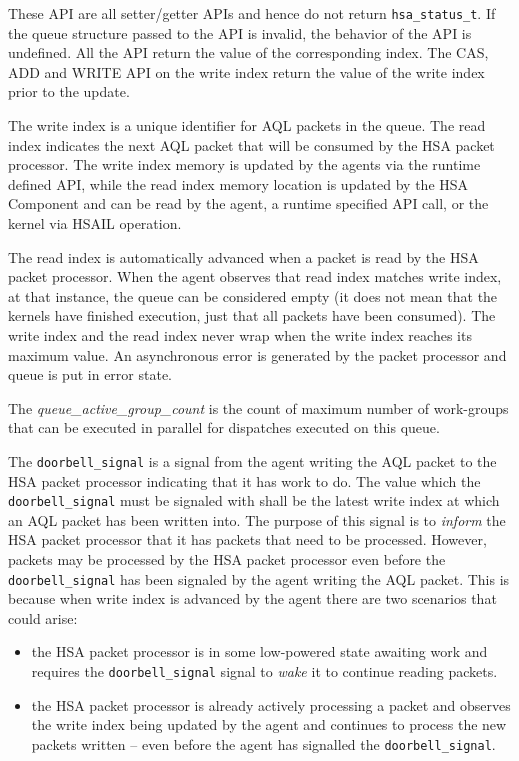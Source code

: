 

These API are all setter/getter APIs and hence do not return
\texttt{hsa\_status\_t}. If the queue structure passed to the API is
invalid, the behavior of the API is undefined. All the API return
the value of the corresponding index. The CAS, ADD and WRITE API on
the write index return the value of the write index prior to the
update.

The write index is a unique identifier for AQL packets in the
queue. The read index indicates the next AQL packet that will be
consumed by the HSA packet processor.  The write index 
memory is updated by the agents via the runtime defined 
API, while the read index memory location is updated by
the H\-S\-A Component and can be read by the agent, 
a runtime specified API call, or the kernel via HSAIL operation.

The read index is automatically advanced when a packet is
read by the HSA packet processor. When the agent observes that read
index matches write index, at that instance, the queue can be
considered empty (it does not mean that the kernels have finished
execution, just that all packets have been consumed). The write
index and the read index never wrap when the write index reaches
its maximum value. An asynchronous error is generated by the packet
processor and queue is put in error state.

The {\itshape
queue\_active\_group\_count} is the count of maximum number of
work-groups that can be executed in parallel for dispatches executed
on this queue.

The \texttt{doorbell\_signal} is a signal from the agent writing the
AQL packet to the HSA packet processor indicating that it has work
to do. The value which the \texttt{doorbell\_signal} must be
signaled with shall be the latest write index at
which an AQL packet has been written into.  The purpose of this
signal is to \emph{inform} the HSA packet processor that it has
packets that need to be processed. However, packets may be processed
by the HSA packet processor even before the
\texttt{doorbell\_signal} has been signaled by the agent writing the
AQL packet.  This is because when write index is advanced by the
agent there are two scenarios that could arise: 

\begin{itemize}
        \item the HSA packet processor is in some low-powered state
                awaiting work and requires the
                \texttt{doorbell\_signal} signal to \emph{wake} it
                to continue reading packets.
        \item the H\-S\-A
                packet processor is already actively processing a
                packet and observes the write index being
                updated by the agent and continues to process the
                new packets written -- even before the agent has
                signalled the \texttt{doorbell\_signal}. 
\end{itemize}

